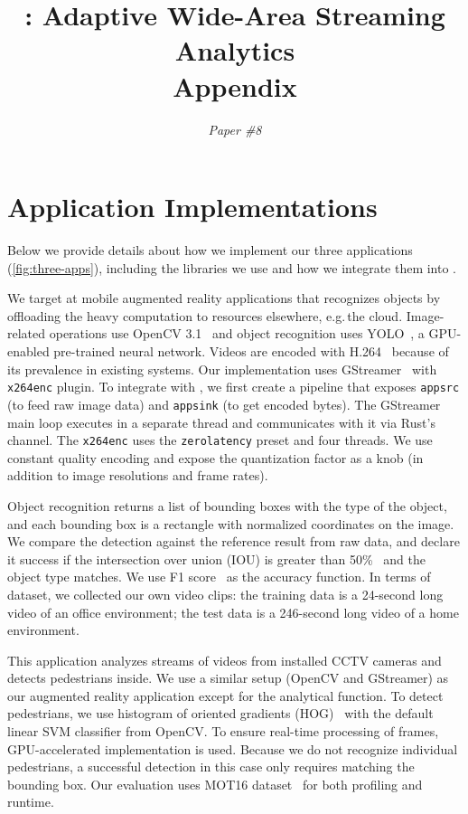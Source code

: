 \documentclass[twocolumn, 9pt]{article}
\begin{document}
\title{\sysname{}: Adaptive Wide-Area Streaming Analytics \\ Appendix}
\author{ \textit{Paper \#8} }
\date{}
\maketitle

\section{Application Implementations}
\label{appendix:appl-impl}

Below we provide details about how we implement our three applications
(\autoref{fig:three-apps}), including the libraries we use and how we integrate
them into \sysname{}.

 We target at mobile augmented reality applications
that recognizes objects by offloading the heavy computation to resources
elsewhere, e.g.\,the cloud.  Image-related operations use OpenCV
3.1~\cite{opencvlibrary} and object recognition uses YOLO~\cite{darknet13,
  redmon2016yolo9000}, a GPU-enabled pre-trained neural network. Videos are
encoded with H.264~\cite{richardson2011h} because of its prevalence in existing
systems. Our implementation uses GStreamer~\cite{gstreamer} with
\texttt{x264enc} plugin. To integrate with \sysname{}, we first create a
pipeline that exposes \texttt{appsrc} (to feed raw image data) and
\texttt{appsink} (to get encoded bytes). The GStreamer main loop executes in a
separate thread and \sysname{} communicates with it via Rust's channel. The
\texttt{x264enc} uses the \texttt{zerolatency} preset and four threads. We use
constant quality encoding and expose the quantization factor as a knob (in
addition to image resolutions and frame rates).

Object recognition returns a list of bounding boxes with the type of the object,
and each bounding box is a rectangle with normalized coordinates on the
image. We compare the detection against the reference result from raw data, and
declare it success if the intersection over union (IOU) is greater than
50\%~\cite{everingham2010pascal} and the object type matches. We use F1
score~\cite{Rijsbergen:1979:IR:539927} as the accuracy function. In terms of
dataset, we collected our own video clips: the training data is a 24-second long
video of an office environment; the test data is a 246-second long video of a
home environment.

 This application analyzes streams of videos from
installed CCTV cameras and detects pedestrians inside. We use a similar setup
(OpenCV and GStreamer) as our augmented reality application except for the
analytical function. To detect pedestrians, we use histogram of oriented
gradients (HOG)~\cite{dalal2005histograms} with the default linear SVM
classifier from OpenCV. To ensure real-time processing of frames,
GPU-accelerated implementation is used. Because we do not recognize individual
pedestrians, a successful detection in this case only requires matching the
bounding box. Our evaluation uses MOT16 dataset~\cite{milan2016mot16} for both
profiling and runtime.
\end{document}
